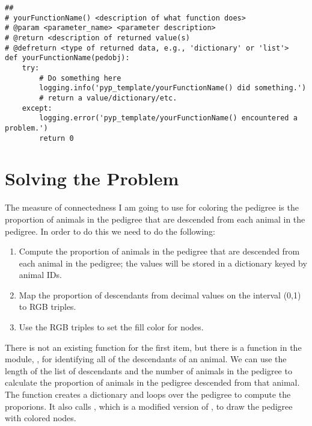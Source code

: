 \begin{verbatim}
##
# yourFunctionName() <description of what function does>
# @param <parameter_name> <parameter description>
# @return <description of returned value(s)
# @defreturn <type of returned data, e.g., 'dictionary' or 'list'>
def yourFunctionName(pedobj):
    try:
        # Do something here
        logging.info('pyp_template/yourFunctionName() did something.')
        # return a value/dictionary/etc.
    except:
        logging.error('pyp_template/yourFunctionName() encountered a problem.')
        return 0
\end{verbatim}
\section{Solving the Problem}
\label{sec:newfeatures-solving-the-problem}
The measure of connectedness I am going to use for coloring the pedigree is the proportion of animals in the pedigree that are descended from each animal in the pedigree.  In order to do this we need to do the following:
\begin{enumerate}
\item Compute the proportion of animals in the pedigree that are descended from each animal in the pedigree; the values will
be stored in a dictionary keyed by animal IDs.
\item Map the proportion of descendants from decimal values on the interval (0,1) to RGB triples.
\item Use the RGB triples to set the fill color for nodes.
\end{enumerate}
There is not an existing function for the first item, but there is a function in the  module, , for identifying all of the descendants of an animal.  We can use the length of the list of descendants and the number of animals in the pedigree to calculate the proportion of animals in the pedigree descended from that animal.  The  function creates a dictionary and loops over the pedigree to compute the proporions.  It also calls , which is a modified version of , to draw the pedigree with colored nodes.
